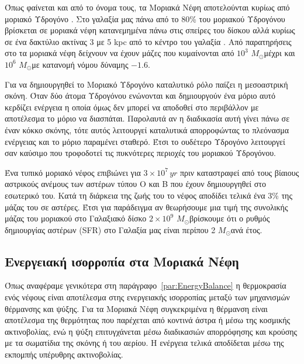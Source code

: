 \documentclass[a4paper,12pt]{memoir}
\newcommand{\sm}{$M_{\odot}$}
\begin{document}
Όπως φαίνεται και από το όνομα τους, τα Μοριακά Νέφη αποτελούνται κυρίως από μοριακό Υδρογόνο . Στο γαλαξία μας πάνω από το 80\% του μοριακού Υδρογόνου βρίσκεται σε μοριακά νέφη κατανεμημένα πάνω στις σπείρες του δίσκου αλλά κυρίως σε ένα δακτύλιο ακτίνας 3 με 5 kpc από το κέντρο του γαλαξία .  Από παρατηρήσεις στο  τα μοριακά νέφη δείχνουν να έχουν μάζες που κυμαίνονται από $10^3$ \sm μέχρι και $10^6$ \sm με κατανομή νόμου δύναμης $-1.6$. \cite{stahlern_2004}

Για να δημιουργηθεί το Μοριακό Υδρογόνο καταλυτικό ρόλο παίζει η μεσοαστρική σκόνη.  Όταν δύο άτομα Υδρογόνου ενώνονται και δημιουργούν ένα μόριο  αυτό κερδίζει ενέργεια η οποία όμως δεν μπορεί να αποδοθεί στο περιβάλλον με αποτέλεσμα το μόριο να διασπάται. Παρολαυτά αν η διαδικασία αυτή γίνει πάνω σε έναν κόκκο σκόνης, τότε αυτός λειτουργεί καταλυτικά απορροφώντας το πλεόνασμα ενέργειας και το μόριο παραμένει σταθερό. Έτσι το ουδέτερο Υδρογόνο λειτουργεί σαν καύσιμο που τροφοδοτεί τις πυκνότερες περιοχές του μοριακού Υδρογόνου. 

Ένα τυπικό μοριακό νέφος επιβιώνει για $3\times 10^7 \, yr$ πριν καταστραφεί από τους βίαιους αστρικούς ανέμους των αστέρων τύπου O και B που έχουν δημιουργηθεί στο εσωτερικό του. Κατά τη διάρκεια της ζωής του το νέφος αποδίδει τελικά ένα 3\% της μάζας του σε αστέρες. Έτσι για παράδειγμα αν θεωρήσουμε μια τιμή της συνολικής μάζας του μοριακού  στο Γαλαξιακό δίσκο $2\times 10^9$ \sm βρίσκουμε ότι ο ρυθμός δημιουργίας αστέρων (SFR) στο Γαλαξία μας είναι περίπου 2 \sm ανά έτος.  

\subsection{Ενεργειακή ισορροπία στα Μοριακά Νέφη}
Όπως αναφέραμε γενικότερα στη παράγραφο~\ref{par:EnergyBalance} η θερμοκρασία ενός νέφους είναι αποτέλεσμα στης ενεργειακής ισορροπίας μεταξύ των μηχανισμών θέρμανσης και ψύξης. Για τα Μοριακά Νέφη συγκεκριμένα η θέρμανση είναι αποτέλεσμα της θερμότητας που παρέχεται από κοντινά άστρα ή μέσω της κοσμικής ακτινοβολίας, ενώ η ψύξη επιτυγχάνεται μέσω διαδικασιών απορρόφησης και κρούσης με τα σωματίδια της σκόνης ή του αερίου.
Η ενέργεια τελικά αποδίδεται μέσω της εκπομπής υπέρυθρης ακτινοβολίας.
\end{document}

